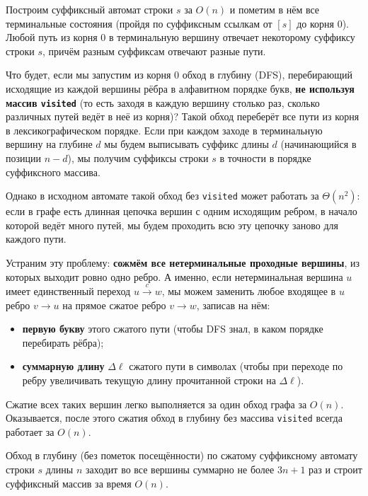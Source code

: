 Построим суффиксный автомат строки $s$ за $O(n)$ и пометим в нём все терминальные состояния (пройдя по суффиксным ссылкам от $[s]$ до корня $0$). Любой путь из корня $0$ в терминальную вершину отвечает некоторому суффиксу строки $s$, причём разным суффиксам отвечают разные пути.

Что будет, если мы запустим из корня $0$ обход в глубину (DFS), перебирающий исходящие из каждой вершины рёбра в алфавитном порядке букв, \textbf{не используя массив \texttt{visited}} (то есть заходя в каждую вершину столько раз, сколько различных путей ведёт в неё из корня)? Такой обход переберёт все пути из корня в лексикографическом порядке. Если при каждом заходе в терминальную вершину на глубине $d$ мы будем выписывать суффикс длины $d$ (начинающийся в позиции $n - d$), мы получим суффиксы строки $s$ в точности в порядке суффиксного массива.

Однако в исходном автомате такой обход без \texttt{visited} может работать за $\Theta(n^2)$: если в графе есть длинная цепочка вершин с одним исходящим ребром, в начало которой ведёт много путей, мы будем проходить всю эту цепочку заново для каждого пути.

Устраним эту проблему: \textbf{сожмём все нетерминальные проходные вершины}, из которых выходит ровно одно ребро. А именно, если нетерминальная вершина $u$ имеет единственный переход $u \xrightarrow{c} w$, мы можем заменить любое входящее в $u$ ребро $v \to u$ на прямое сжатое ребро $v \to w$, записав на нём:
\begin{itemize}
    \item \textbf{первую букву} этого сжатого пути (чтобы DFS знал, в каком порядке перебирать рёбра);
    \item \textbf{суммарную длину} $\Delta \ell$ сжатого пути в символах (чтобы при переходе по ребру увеличивать текущую длину прочитанной строки на $\Delta \ell$).
\end{itemize}
Сжатие всех таких вершин легко выполняется за один обход графа за $O(n)$. Оказывается, после этого сжатия обход в глубину без массива \texttt{visited} всегда работает за $O(n)$.

\begin{theorem}
    Обход в глубину (без пометок посещённости) по сжатому суффиксному автомату строки $s$ длины $n$ заходит во все вершины суммарно не более $3n + 1$ раз и строит суффиксный массив за время $O(n)$.
\end{theorem}

